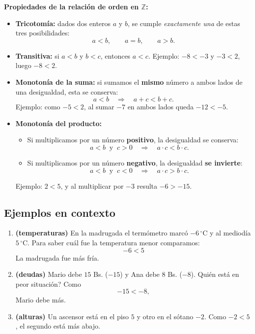 \documentclass[12pt, letterpaper]{article}
\newcommand{\Z}{\mathbb{Z}}
\begin{document}
\begin{cuadroteoria}
  \textbf{Propiedades de la relación de orden en $\Z$:}
  \begin{itemize}
    \item \textbf{Tricotomía:} dados dos enteros $a$ y $b$, se cumple \emph{exactamente una} de estas tres posibilidades:
          \[
            a < b, \qquad a = b, \qquad a > b.
          \]
    \item \textbf{Transitiva:} si $a < b$ y $b < c$, entonces $a < c$.
          Ejemplo: $-8 < -3$ y $-3 < 2$, luego $-8 < 2$.
    \item \textbf{Monotonía de la suma:} si sumamos el \textbf{mismo} número a ambos lados de una desigualdad, esta se conserva:
          \[
            a < b \quad \Longrightarrow \quad a + c < b + c.
          \]
          Ejemplo: como $-5 < 2$, al sumar $-7$ en ambos lados queda $-12 < -5$.
    \item \textbf{Monotonía del producto:}
          \begin{itemize}
            \item Si multiplicamos por un número \textbf{positivo}, la desigualdad se conserva:
                  \[
                    a < b \ \text{ y }\ c > 0 \quad \Longrightarrow \quad a \cdot c < b \cdot c.
                  \]
            \item Si multiplicamos por un número \textbf{negativo}, la desigualdad \textbf{se invierte}:
                  \[
                    a < b \ \text{ y }\ c < 0 \quad \Longrightarrow \quad a \cdot c > b \cdot c.
                  \]
          \end{itemize}
          Ejemplo: $2 < 5$, y al multiplicar por $-3$ resulta $-6 > -15$.
  \end{itemize}
\end{cuadroteoria}

\subsection{Ejemplos en contexto}

\begin{enumerate}[leftmargin=*, label=\textbf{Ejemplo \arabic*.}]
  \item \textbf{(temperaturas)} En la madrugada el termómetro marcó $-6\,^{\circ}$C y al mediodía $5\,^{\circ}$C. Para saber cuál fue la temperatura menor comparamos:
        \[
          -6 < 5
        \]
        La madrugada fue más fría.

  \item \textbf{(deudas)} Mario debe $15$ Bs. ($-15$) y Ana debe $8$ Bs. ($-8$). \textquestiondown Quién está en peor situación? Como
        \[
          -15 < -8,
        \]
        Mario debe más.

  \item \textbf{(alturas)} Un ascensor está en el piso $5$ y otro en el sótano $-2$. Como $-2 < 5$, el segundo está más abajo.
\end{enumerate}
\end{document}
